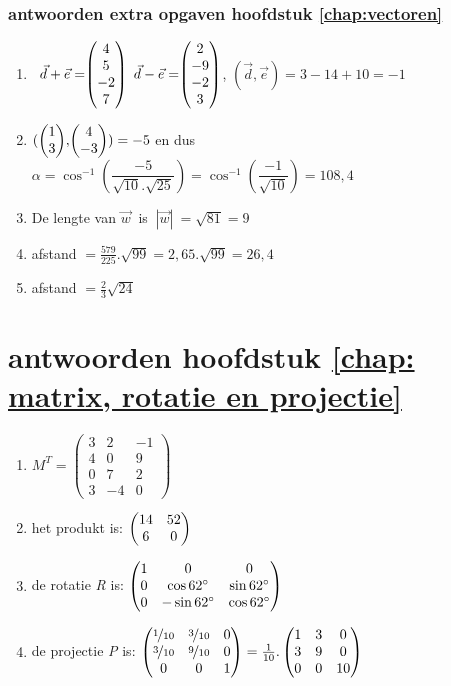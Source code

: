 \subsubsection{antwoorden extra opgaven hoofdstuk \ref{chap:vectoren}}
\begin{enumerate}
	
	\item  \ $ \vec{d} + \vec{e}  = \vecvier{4}{5}{-2}{7} $   \qquad $ \vec{d} - \vec{e} = \vecvier{2}{-9}{-2}{3} $,   \qquad $  (\vec{d} , \vec{e}) = 3-14+10 = -1 $ 
	
	\item $  (\vectwee{1}{3} , \vectwee{4}{-3}) = -5 $  en dus $\alpha = \cos ^{-1} (\dfrac{-5}{\sqrt{10}.\sqrt{25}})= \cos ^{-1} (\dfrac{-1}{\sqrt{10}}) = 108,4 $ 
	
	\item De lengte van  $  \vec{w} \ $ is $ \ |\vec{w}| \  =  \sqrt{81} = 9 $
	
	\item afstand  $ = \frac{579}{225}.\sqrt{99} = 2,65 . \sqrt{99} = 26,4 $
	
	\item    afstand  $ = \frac{2}{3}\sqrt{24} $
\end{enumerate}	

\section{antwoorden  hoofdstuk \ref{chap: matrix, rotatie en projectie}}
\begin{enumerate}
	\item  
	$ M^{T} =	\begin{pmatrix}
	3 & 2 & -1\\
	4&0&9\\
	0&7&2\\
	3&-4&0 
	\end{pmatrix} $
	\item
	het produkt is:  $ \begin{pmatrix} 14&52 \\ 6&0 \end{pmatrix}  $
	\item
	de rotatie \textit{R} is:  
	$ \begin{pmatrix} 1&0&0 \\ 0&\cos  62 \degree  & \sin 62 \degree \\ 0& -\sin 62 \degree & \cos 62 \degree \end{pmatrix}  $
	\item
	de projectie \textit{P} is:  
	$ \begin{pmatrix} \nicefrac{1}{10}&\nicefrac{3}{10}&0 \\ \nicefrac{3}{10}&\nicefrac{9}{10}  & 0 \\ 0& 0 & 1 \end{pmatrix}  
	= \frac{1}{10} .\begin{pmatrix} 1&3&0 \\ 3&9  & 0 \\ 0& 0 & 10 \end{pmatrix} $    
	
\end{enumerate}

